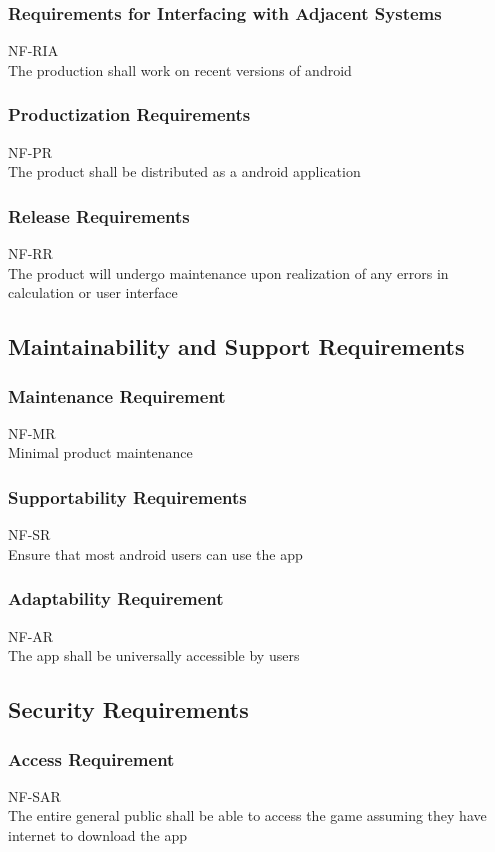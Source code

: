 \documentclass[12pt, titlepage]{article}
\begin{document}
\subsubsection{Requirements for Interfacing with Adjacent Systems}
NF-RIA \\
The production shall work on recent versions of android

 \subsubsection{Productization Requirements}
 NF-PR \\
The product shall be distributed as a android application 

\subsubsection{Release Requirements}
NF-RR \\
The product will undergo maintenance upon realization of any errors in calculation or user interface




\subsection{Maintainability and Support Requirements}
\subsubsection{Maintenance Requirement}
NF-MR \\
Minimal product maintenance 

\subsubsection{Supportability Requirements}
NF-SR \\
Ensure that most  android users can use the app

\subsubsection{Adaptability Requirement}
NF-AR \\
The app shall be universally accessible by users 

\subsection{Security Requirements}
\subsubsection{Access Requirement}
NF-SAR \\
The entire general public shall be able to access the game assuming they have internet to download the app 
\end{document}
